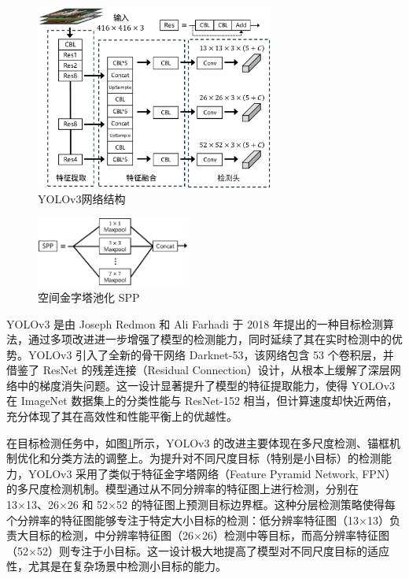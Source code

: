 \documentclass[11pt,twocolumn]{ctexart}
\begin{document}
\begin{figure}[!hbtp]
  \begin{center}
  \includegraphics[width=0.7\textwidth]{YOLOv3结构图}
    \end{center}
  \caption{YOLOv3网络结构}
  \label{YOLOV3网络结构}
\end{figure}

\begin{figure}[!hbtp]
  \begin{center}
  \includegraphics[width=0.45\textwidth]{SPP}
    \end{center}
  \caption{空间金字塔池化 SPP}
  \label{SPP}
\end{figure}

YOLOv3\cite{farhadi2018yolov3} 是由 Joseph Redmon 和 Ali Farhadi 于 2018 年提出的一种目标检测算法，通过多项改进进一步增强了模型的检测能力，同时延续了其在实时检测中的优势。YOLOv3 引入了全新的骨干网络 Darknet-53，该网络包含 53 个卷积层，并借鉴了 ResNet\cite{he2016deep} 的残差连接（Residual Connection）设计，从根本上缓解了深层网络中的梯度消失问题。这一设计显著提升了模型的特征提取能力，使得 YOLOv3 在 ImageNet 数据集上的分类性能与 ResNet-152 相当，但计算速度却快近两倍，充分体现了其在高效性和性能平衡上的优越性。

在目标检测任务中，如图\ref{YOLOV3网络结构}所示，YOLOv3 的改进主要体现在多尺度检测、锚框机制优化和分类方法的调整上。为提升对不同尺度目标（特别是小目标）的检测能力，YOLOv3 采用了类似于特征金字塔网络（Feature Pyramid Network, FPN）\cite{lin2017feature}的多尺度检测机制。模型通过从不同分辨率的特征图上进行检测，分别在 13×13、26×26 和 52×52 的特征图上预测目标边界框。这种分层检测策略使得每个分辨率的特征图能够专注于特定大小目标的检测：低分辨率特征图（13×13）负责大目标的检测，中分辨率特征图（26×26）检测中等目标，而高分辨率特征图（52×52）则专注于小目标。这一设计极大地提高了模型对不同尺度目标的适应性，尤其是在复杂场景中检测小目标的能力。
\end{document}
